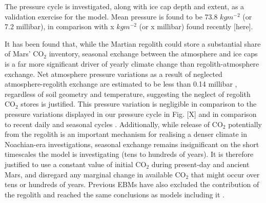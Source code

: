 \documentclass[12pt,onecolumn]{revtex4-2}    %
\begin{document}
The pressure cycle is investigated, along with ice cap depth and extent, as a validation exercise for the model. Mean pressure is found to be 73.8 $kgm^{-2}$ (or 7.2 millibar), in comparison with x $kgm^{-2}$ (or x millibar) found recently [here]. 

It has been found that, while the Martian regolith could store a substantial share of Mars' $\mathrm{CO_2}$ inventory, seasonal exchange between the atmosphere and ice caps is a far more significant driver of yearly climate change than regolith-atmosphere exchange. Net atmosphere pressure variations as a result of neglected atmosphere-regolith exchange are estimated to be less than 0.14 millibar \cite{FBSJS82}, regardless of soil geometry and temperature, suggesting the neglect of regolith $\mathrm{CO_2}$ stores is justified. This pressure variation is negligible in comparison to the pressure variations displayed in our pressure cycle in Fig. [X] and in comparison to recent daily and seasonal cycles \cite{H24}. Additionally, while release of $\mathrm{CO_2}$ potentially from the regolith is an important mechanism for realising a denser climate in Noachian-era investigations, seasonal exchange remains insignificant on the short timescales the model is investigating (tens to hundreds of years). It is therefore justified to use a constant value of initial $\mathrm{CO_2}$ during present-day and ancient Mars, and disregard any marginal change in available $\mathrm{CO_2}$ that might occur over tens or hundreds of years.
Previous EBMs have also excluded the contribution of the regolith and reached the same conclusions as models including it \cite{NT01}.

\
\end{document}
